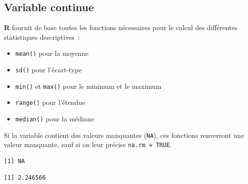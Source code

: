 \documentclass[
  letterpaper,
  DIV=11,
  numbers=noendperiod,
  oneside]{scrreprt}
\newenvironment{Shaded}{\begin{snugshade}}{\end{snugshade}}
\newcommand{\AttributeTok}[1]{\textcolor[rgb]{0.40,0.45,0.13}{#1}}
\newcommand{\ConstantTok}[1]{\textcolor[rgb]{0.56,0.35,0.01}{#1}}
\newcommand{\FunctionTok}[1]{\textcolor[rgb]{0.28,0.35,0.67}{#1}}
\newcommand{\NormalTok}[1]{\textcolor[rgb]{0.00,0.23,0.31}{#1}}
\newcommand{\SpecialCharTok}[1]{\textcolor[rgb]{0.37,0.37,0.37}{#1}}
\providecommand{\tightlist}{%
  \setlength{\itemsep}{0pt}\setlength{\parskip}{0pt}}\usepackage{longtable,booktabs,array}
\begin{document}
\hypertarget{variable-continue-1}{%
\subsection{Variable continue}\label{variable-continue-1}}

\textbf{R} fournit de base toutes les fonctions nécessaires pour le
calcul des différentes statistiques descriptives~:

\begin{itemize}
\tightlist
\item
  \texttt{mean()} pour la moyenne
\item
  \texttt{sd()} pour l'écart-type
\item
  \texttt{min()} et \texttt{max()} pour le minimum et le maximum
\item
  \texttt{range()} pour l'étendue
\item
  \texttt{median()} pour la médiane
\end{itemize}

Si la variable contient des valeurs manquantes (\texttt{NA}), ces
fonctions renverront une valeur manquante, sauf si on leur précise
\texttt{na.rm\ =\ TRUE}.

\begin{Shaded}
\end{Shaded}

\begin{verbatim}
[1] NA
\end{verbatim}

\begin{Shaded}
\end{Shaded}

\begin{verbatim}
[1] 2.246566
\end{verbatim}

\begin{Shaded}
\end{Shaded}
\end{document}
